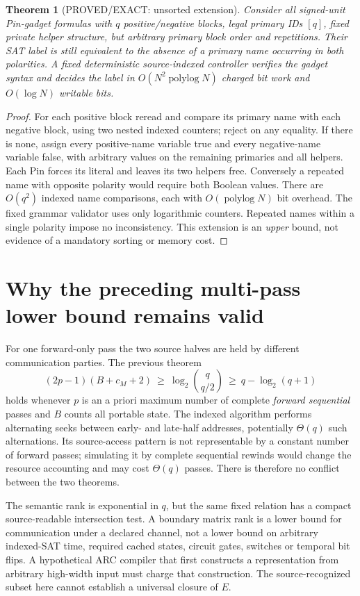 \documentclass[11pt]{article}
\newtheorem{theorem}{Theorem}
\begin{document}
\begin{theorem}[PROVED/EXACT: unsorted extension]
Consider all signed-unit Pin-gadget formulas with \(q\) positive/negative blocks, legal primary IDs \([q]\), fixed private helper structure, but arbitrary primary block order and repetitions. Their SAT label is still equivalent to the \emph{absence} of a primary name occurring in both polarities. A fixed deterministic source-indexed controller verifies the gadget syntax and decides the label in \(O(N^2\operatorname{polylog}N)\) charged bit work and \(O(\log N)\) writable bits.
\end{theorem}
\begin{proof}
For each positive block reread and compare its primary name with each negative block, using two nested indexed counters; reject on any equality. If there is none, assign every positive-name variable true and every negative-name variable false, with arbitrary values on the remaining primaries and all helpers. Each Pin forces its literal and leaves its two helpers free. Conversely a repeated name with opposite polarity would require both Boolean values. There are \(O(q^2)\) indexed name comparisons, each with \(O(\operatorname{polylog}N)\) bit overhead. The fixed grammar validator uses only logarithmic counters. Repeated names within a single polarity impose no inconsistency. This extension is an \emph{upper} bound, not evidence of a mandatory sorting or memory cost.
\end{proof}

\section{Why the preceding multi-pass lower bound remains valid}
For one forward-only pass the two source halves are held by different communication parties. The previous theorem
\[
 (2p-1)(B+c_M+2)\ \ge\ \log_2\binom q{q/2}\ \ge\ q-\log_2(q+1)
\]
holds whenever \(p\) is an a priori maximum number of complete \emph{forward sequential} passes and \(B\) counts all portable state. The indexed algorithm performs alternating seeks between early- and late-half addresses, potentially \(\Theta(q)\) such alternations. Its source-access pattern is not representable by a constant number of forward passes; simulating it by complete sequential rewinds would change the resource accounting and may cost \(\Theta(q)\) passes. There is therefore no conflict between the two theorems.

The semantic rank is exponential in \(q\), but the same fixed relation has a compact source-readable intersection test. A boundary matrix rank is a lower bound for communication under a declared channel, not a lower bound on arbitrary indexed-SAT time, required cached states, circuit gates, switches or temporal bit flips. A hypothetical ARC compiler that first constructs a representation from arbitrary high-width input must charge that construction. The source-recognized subset here cannot establish a universal closure of \(E\).
\end{document}

